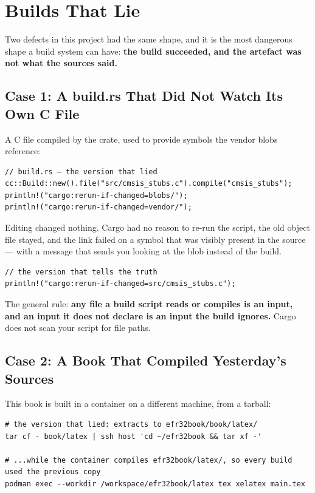 \section{Builds That Lie}
\label{sec:builds-that-lie}

Two defects in this project had the same shape, and it is the most dangerous shape a build system can
have: \textbf{the build succeeded, and the artefact was not what the sources said.}

\subsection{Case 1: A build.rs That Did Not Watch Its Own C File}

A C file compiled by the  crate, used to provide symbols the vendor blobs reference:

\begin{verbatim}
// build.rs — the version that lied
cc::Build::new().file("src/cmsis_stubs.c").compile("cmsis_stubs");
println!("cargo:rerun-if-changed=blobs/");
println!("cargo:rerun-if-changed=vendor/");
\end{verbatim}

Editing  changed nothing. Cargo had no reason to re-run the script, the
old object file stayed, and the link failed on a symbol that was visibly present in the source — with
a message that sends you looking at the blob instead of the build.

\begin{verbatim}
// the version that tells the truth
println!("cargo:rerun-if-changed=src/cmsis_stubs.c");
\end{verbatim}

The general rule: \textbf{any file a build script reads or compiles is an input, and an input it does
not declare is an input the build ignores.} Cargo does not scan your script for file paths.

\subsection{Case 2: A Book That Compiled Yesterday's Sources}

This book is built in a container on a different machine, from a tarball:

\begin{verbatim}
# the version that lied: extracts to efr32book/book/latex/
tar cf - book/latex | ssh host 'cd ~/efr32book && tar xf -'

# ...while the container compiles efr32book/latex/, so every build used the previous copy
podman exec --workdir /workspace/efr32book/latex tex xelatex main.tex
\end{verbatim}

